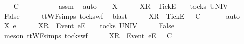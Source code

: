 \begin{isabellebody}
\ \isamarkupfalse%
\ {\isachardoublequoteopen}{\isasymrho}\ {\isasymlesssim}\isactrlsub C\ {\isasymsigma}{\isacharprime}{\isacharprime}{\isachardoublequoteclose}\isanewline
\ \ \ \ \isamarkupfalse%
\ {}\ {}\ {}\ {}\ assm{}\ \isamarkupfalse%
\ auto\isanewline
{}\isamarkupfalse%
\isanewline
\ \ \isamarkupfalse%
\ X\ {\isasymrho}\ {\isasymsigma}{\isacharprime}{\isacharprime}\isanewline
\ \ \isamarkupfalse%
\ {\isachardoublequoteopen}{\isacharbrackleft}X{\isacharbrackright}\isactrlsub R\ {\isacharhash}\ {\isacharbrackleft}Tick{\isacharbrackright}\isactrlsub E\ {\isacharhash}\ {\isasymrho}\ {\isasymin}\ tocks\ UNIV{\isachardoublequoteclose}\isanewline
\ \ \isamarkupfalse%
\ \isamarkupfalse%
\ {\isachardoublequoteopen}False{\isachardoublequoteclose}\isanewline
\ \ \ \ \isamarkupfalse%
\ ttWF{\isachardot}simps{\isacharparenleft}{}{}{\isacharparenright}\ tocks{\isacharunderscore}wf\ \isamarkupfalse%
\ blast\isanewline
\ \ \isamarkupfalse%
\ \isamarkupfalse%
\ {\isachardoublequoteopen}{\isacharbrackleft}X{\isacharbrackright}\isactrlsub R\ {\isacharhash}\ {\isacharbrackleft}Tick{\isacharbrackright}\isactrlsub E\ {\isacharhash}\ {\isasymrho}\ {\isasymlesssim}\isactrlsub C\ {\isasymsigma}{\isacharprime}{\isacharprime}{\isachardoublequoteclose}\isanewline
\ \ \ \ \isamarkupfalse%
\ auto\isanewline
{}\isamarkupfalse%
\isanewline
\ \ \isamarkupfalse%
\ X\ e\ {\isasymrho}\ {\isasymsigma}{\isacharprime}{\isacharprime}\isanewline
\ \ \isamarkupfalse%
\ {\isachardoublequoteopen}{\isacharbrackleft}X{\isacharbrackright}\isactrlsub R\ {\isacharhash}\ {\isacharbrackleft}Event\ e{\isacharbrackright}\isactrlsub E\ {\isacharhash}\ {\isasymrho}\ {\isasymin}\ tocks\ UNIV{\isachardoublequoteclose}\isanewline
\ \ \isamarkupfalse%
\ \isamarkupfalse%
\ {\isachardoublequoteopen}False{\isachardoublequoteclose}\isanewline
\ \ \ \ \isamarkupfalse%
\ {\isacharparenleft}meson\ ttWF{\isachardot}simps{\isacharparenleft}{}{}{\isacharparenright}\ tocks{\isacharunderscore}wf{\isacharparenright}\isanewline
\ \ \isamarkupfalse%
\ \isamarkupfalse%
\ {\isachardoublequoteopen}{\isacharbrackleft}X{\isacharbrackright}\isactrlsub R\ {\isacharhash}\ {\isacharbrackleft}Event\ e{\isacharbrackright}\isactrlsub E\ {\isacharhash}\ {\isasymrho}\ {\isasymlesssim}\isactrlsub C\ {\isasymsigma}{\isacharprime}{\isacharprime}{\isachardoublequoteclose}\isanewline

\end{isabellebody}
